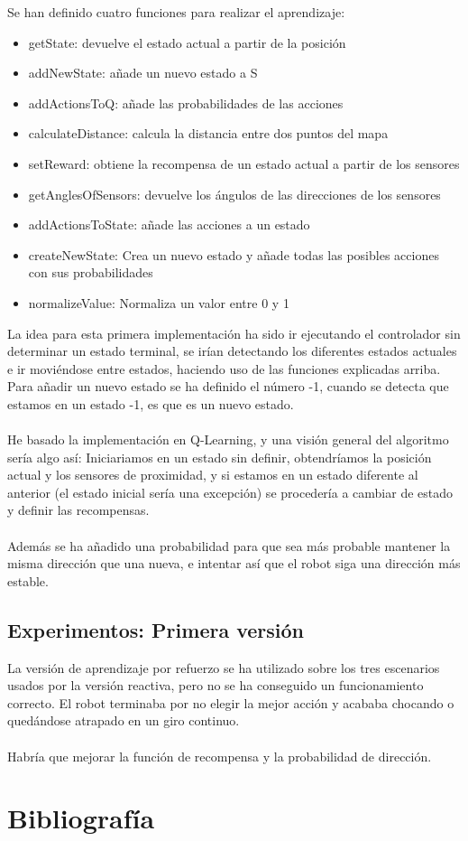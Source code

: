 \documentclass[14pt]{extarticle}
\theoremstyle{definition}
\theoremstyle{remark}
\begin{document}
Se han definido cuatro funciones para realizar el aprendizaje:
\begin{itemize}
	\item getState: devuelve el estado actual a partir de la posición
	\item addNewState: añade un nuevo estado a S
	\item addActionsToQ: añade las probabilidades de las acciones
	\item calculateDistance: calcula la distancia entre dos puntos del mapa
	\item setReward: obtiene la recompensa de un estado actual a partir de los sensores
	\item getAnglesOfSensors: devuelve los ángulos de las direcciones de los sensores	
	\item addActionsToState: añade las acciones a un estado
	\item createNewState: Crea un nuevo estado y añade todas las posibles acciones con sus probabilidades
	\item normalizeValue: Normaliza un valor entre 0 y 1
\end{itemize}

La idea para esta primera implementación ha sido ir ejecutando el controlador sin determinar un estado terminal, se irían detectando los diferentes estados actuales e ir moviéndose entre estados, haciendo uso de las funciones explicadas arriba. Para añadir un nuevo estado se ha definido el número -1, cuando se detecta que estamos en un estado -1, es que es un nuevo estado.\\\\
He basado la implementación en Q-Learning, y una visión general del algoritmo sería algo así: Iniciariamos en un estado sin definir, obtendríamos la posición actual y los sensores de proximidad, y si estamos en un estado diferente al anterior (el estado inicial sería una excepción) se procedería a cambiar de estado y definir las recompensas.\\\\
Además se ha añadido una probabilidad para que sea más probable mantener la misma dirección que una nueva, e intentar así que el robot siga una dirección más estable.
\subsection{Experimentos: Primera versión}\label{subsec:experimentosprimeraversion}
La versión de aprendizaje por refuerzo se ha utilizado sobre los tres escenarios usados por la versión reactiva, pero no se ha conseguido un funcionamiento correcto. El robot terminaba por no elegir la mejor acción y acababa chocando o quedándose atrapado en un giro continuo.\\\\
Habría que mejorar la función de recompensa y la probabilidad de dirección.

\newpage
\section{Bibliografía}\label{sec:bibliografia}


\end{document}
